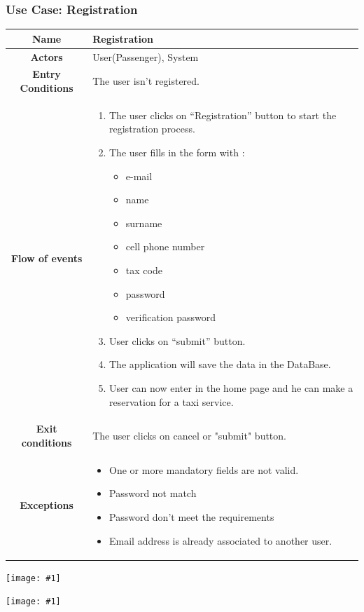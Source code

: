 \documentclass[11pt, a4paper,titlepage]{article}
\newcommand{\image}[1]{
	\begin{center}
		\noindent \texttt{[image: \#1]}
	\end{center}
	}
\begin{document}
\subsubsection{Use Case: Registration}
	\begin{tabularx}{\textwidth}{| c | X |}
		\hline
		\textbf{Name} & 
		Registration
		\\
		\hline
		\textbf{Actors} & 
		User(Passenger), System 
		\\
		\hline
		\textbf{Entry Conditions} &
		The user isn’t registered. 
		\\
		\hline
		\textbf{Flow of events} & 
		\begin{enumerate}
			\item The user clicks on “Registration” button to start the registration process.
			\item The user fills in the form with :
				\begin{itemize}
					\item e-mail
					\item name
					\item surname
					\item cell phone number
					\item tax code
					\item password
					\item verification password
				\end{itemize}
			\item User clicks on “submit” button.
			\item The application will save the data in the DataBase.
			\item User can now enter in the home page and he can make a reservation for a taxi service.	
		\end{enumerate}						
		\\
		\hline
		\textbf{Exit conditions} & 
		The user clicks on cancel or "submit" button. 
		\\
		\hline
		\textbf{Exceptions} & 
		\begin{itemize}
			\item One or more mandatory fields are not valid.
			\item Password not match
			\item Password don't meet the requirements
			\item Email address is already associated to another user.
		\end{itemize} 
		\\
		\hline		
	\end{tabularx}
	\image{usecase_registration.png}
	\image{diagram_sequence_registration.png}
\end{document}
